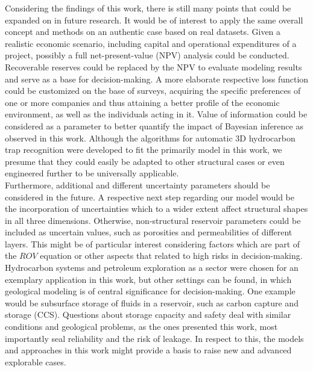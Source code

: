 	Considering the findings of this work, there is still many points that could be expanded on in future research. It would be of interest to apply the same overall concept and methods on an authentic case based on real datasets. Given a realistic economic scenario, including capital and operational expenditures of a project, possibly a full net-present-value (NPV) analysis could be conducted. Recoverable reserves could be replaced by the NPV to evaluate modeling results and serve as a base for decision-making. A more elaborate respective loss function could be customized on the base of surveys, acquiring the specific preferences of one or more companies and thus attaining a better profile of the economic environment, as well as the individuals acting in it. Value of information could be considered as a parameter to better quantify the impact of Bayesian inference as observed in this work.
	Although the algorithms for automatic 3D hydrocarbon trap recognition were developed to fit the primarily model in this work, we presume that they could easily be adapted to other structural cases or even engineered further to be universally applicable.\\
	Furthermore, additional and different uncertainty parameters should be considered in the future. A respective next step regarding our model would be the incorporation of uncertainties which to a wider extent affect structural shapes in all three dimensions. Otherwise, non-structural reservoir parameters could be included as uncertain values, such as porosities and permeabilities of different layers. This might be of particular interest considering factors which are part of the $ROV$ equation or other aspects that related to high risks in decision-making.\\
	Hydrocarbon systems and petroleum exploration as a sector were chosen for an exemplary application in this work, but other settings can be found, in which geological modeling is of central significance for decision-making. One example would be subsurface storage of fluids in a reservoir, such as carbon capture and storage (CCS). Questions about storage capacity and safety deal with similar conditions and geological problems, as the ones presented this work, most importantly seal reliability and the risk of leakage. In respect to this, the models and approaches in this work might provide a basis to raise new and advanced explorable cases.